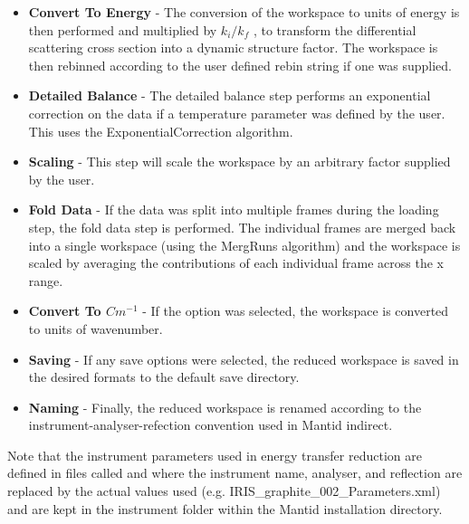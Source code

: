 \documentclass[paper=a4, fontsize=11pt]{scrartcl}	%
\numberwithin{equation}{section}															%
\numberwithin{figure}{section}																%
\numberwithin{table}{section}																%
\begin{document}
\begin{itemize}
\item \textbf{Convert To Energy} - The conversion of the workspace to units of energy is then performed and multiplied by $k_i / k_f$ , to transform the differential scattering cross section into a dynamic structure factor. The workspace is then rebinned according to the user defined rebin string if one was supplied.

\item \textbf{Detailed Balance} - The detailed balance step performs an exponential correction on the data if a temperature parameter was defined by the user. This uses the ExponentialCorrection algorithm.

\item \textbf{Scaling} - This step will scale the workspace by an arbitrary factor supplied by the user.

\item \textbf{Fold Data} - If the data was split into multiple frames during the loading step, the fold data step is performed. The individual frames are merged back into a single workspace (using the MergRuns algorithm) and the workspace is scaled by averaging the contributions of each individual frame across the x range.

\item \textbf{Convert To $Cm^{-1}$} - If the option was selected, the workspace is converted to units of wavenumber.

\item \textbf{Saving} - If any save options were selected, the reduced workspace is saved in the desired formats to the default save directory.
\item \textbf{Naming} - Finally, the reduced workspace is renamed according to the instrument-analyser-refection convention used in Mantid indirect.
\end{itemize}

Note that the instrument parameters used in energy transfer reduction are defined in files called  and  where the instrument name, analyser, and reflection are replaced by the actual values used (e.g. IRIS\_graphite\_002\_Parameters.xml) and are kept in the instrument folder within the Mantid installation directory.
\end{document}
